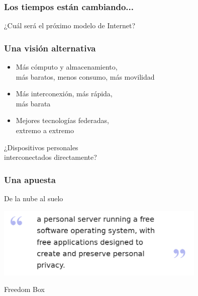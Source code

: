 \documentclass[17pt,aspectratio=169,hyperref=pdfusetitle]{beamer}
\begin{document}
\begin{frame}[fragile]
  \frametitle{Los tiempos están cambiando...}


  ¿Cuál será el próximo modelo de Internet?
  
\end{frame}


\begin{frame}
\frametitle{Una visión alternativa}

\begin{itemize}
\item Más cómputo y almacenamiento, \\
  más baratos, menos consumo, más movilidad \\
\item Más interconexión, más rápida, \\
  más barata \\
\item Mejores tecnologías federadas, \\
  extremo a extremo \\
\end{itemize}

  \begin{flushright}
  ¿Dispositivos personales \\
  interconectados directamente? \\
  \end{flushright}

\end{frame}

\begin{frame}[fragile]
  \frametitle{Una apuesta}

  De la nube al suelo

  \begin{center}
  \includegraphics[width=10cm]{figs/freedom-box}
  \end{center}

  Freedom Box
  
\end{frame}
\end{document}
